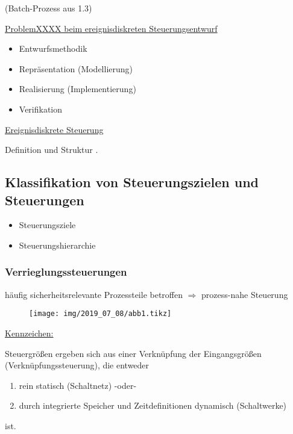  (Batch-Prozess aus 1.3)

\underline{ProblemXXXX beim ereignisdiskreten Steuerungsentwurf}
\begin{itemize}
	\item Entwurfsmethodik
	\item Repräsentation (Modellierung)
	\item Realisierung (Implementierung)
	\item Verifikation
\end{itemize}

\underline{Ereignisdiskrete Steuerung}

Definition und Struktur .

\subsection{Klassifikation von Steuerungszielen und Steuerungen}
\begin{itemize}
	\item Steuerungsziele
	\item Steuerungshierarchie
\end{itemize}

\subsubsection{Verrieglungssteuerungen}\label{subsec:verr}
häufig sicherheitsrelevante Prozessteile betroffen $\Rightarrow$ prozess-nahe Steuerung


\begin{figure}[H]
	\centering
	\texttt{[image: img/2019\_07\_08/abb1.tikz]}
\end{figure}

\underline{Kennzeichen:}

Steuergrößen ergeben sich aus einer Verknüpfung der Eingangsgrößen (Verknüpfungssteuerung), die entweder 
\begin{enumerate}[label=(\alph*)]
	\item rein statisch (Schaltnetz) -oder-
	\item durch integrierte Speicher und Zeitdefinitionen dynamisch (Schaltwerke)
\end{enumerate}
ist.

